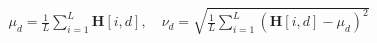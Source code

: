 \documentclass[10pt]{article}
\begin{document}
\begin{align*}\mu_d = \frac{1}{L} \sum_{i=1}^L \mathbf{H}[i, d], \quad \nu_d = \sqrt{\frac{1}{L} \sum_{i=1}^L (\mathbf{H}[i, d] - \mu_d)^2}\end{align*}
\end{document}
